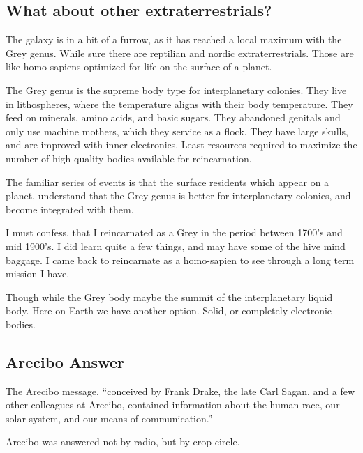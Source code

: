 \documentclass{report}
\begin{document}
\subsection{What about other extraterrestrials?}
The galaxy is in a bit of a furrow, as it has reached a local maximum with the
Grey genus. While sure there are reptilian and nordic extraterrestrials. Those
are like homo-sapiens optimized for life on the surface of a planet. 

The Grey genus is the supreme body type for interplanetary colonies. They live
in lithospheres, where the temperature aligns with their body temperature. They
feed on minerals, amino acids, and basic sugars. They abandoned genitals and
only use machine mothers, which they service as a flock. They have large skulls,
and are improved with inner electronics. Least resources
required to maximize the number of high quality bodies available for reincarnation. 

The familiar series of events is that the surface residents which appear on a
planet, understand that the Grey genus is better for interplanetary colonies, and
become integrated with them. 

I must confess, that I reincarnated as a Grey in the period between 1700's and
mid 1900's. I did learn quite a few things, and may have some of the hive mind 
baggage. I came back to reincarnate as a homo-sapien to see through a long term
mission I have.

Though while the Grey body maybe the summit of the interplanetary liquid body.
Here on Earth we have another option. Solid, or completely electronic bodies.

\subsection{Arecibo Answer}
\label{arecibo}

The Arecibo message, ``conceived by Frank Drake, the late Carl Sagan, and a few
other colleagues at Arecibo, contained information about the human race, our
solar system, and our means of communication.''\cite{chilbolton}

Arecibo was answered not by radio, but by crop circle. 
\end{document}
